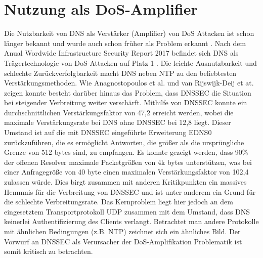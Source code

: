 \section{Nutzung als DoS-Amplifier}
\label{sec:Thread-DosAmp}

Die Nutzbarkeit von DNS als Verstärker (Amplifier) von DoS Attacken ist schon länger bekannt und wurde auch schon früher als Problem erkannt \cite{ICANN2006}. Nach dem Anual Wordwide Infrastructure Security Report 2017 befindet sich DNS als Trägertechnologie von DoS-Attacken auf Platz 1 \cite{Alcoy2017}. Die leichte Ausnutzbarkeit und schlechte Zurückverfolgbarkeit macht DNS neben NTP zu den beliebtesten Verstärkungsmethoden. Wie Anagnostopoulos et al.\cite{Anagnostopoulos2013} und van Rijswijk-Deij et at.\cite{VanRijswijk-Deij2014} zeigen konnte besteht darüber hinaus das Problem, dass DNSSEC die Situation bei steigender Verbreitung weiter verschärft. Mithilfe von DNSSEC konnte ein durchschnittlichen Verstärkungsfaktor von 47,2 erreicht werden, wobei die maximale Verstärkungsrate bei DNS ohne DNSSEC bei 12,8 liegt. Dieser Umstand ist auf die mit DNSSEC eingeführte Erweiterung EDNS0 zurückzuführen, die es ermöglicht Antworten, die größer als die ursprüngliche Grenze von 512 bytes sind, zu empfangen. Es konnte gezeigt werden, dass 90\% der offenen Resolver maximale Packetgrößen von 4k bytes unterstützen, was bei einer Anfragegröße von 40 byte einen maximalen Verstärkungsfaktor von 102,4 zulassen würde. Dies birgt zusammen mit anderen Kritikpunkten ein massives Hemmnis für die Verbreitung von DNSSEC und ist unter anderem ein Grund für die schlechte Verbreitungsrate. Das Kernproblem liegt hier jedoch an dem eingesetztem Transportprotokoll UDP zusammen mit dem Umstand, dass DNS keinerlei Authentifizierung des Clients verlangt. Betrachtet man andere Protokolle mit ähnlichen Bedingungen (z.B. NTP) zeichnet sich ein ähnliches Bild. Der Vorwurf an DNSSEC als Verursacher der DoS-Amplifikation Problematik ist somit kritisch zu betrachten.

